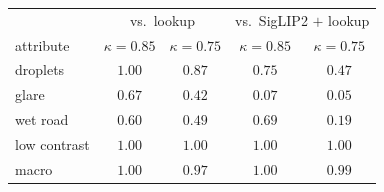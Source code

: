 \begin{tabular}{lcccc}
\toprule
 & \multicolumn{2}{c}{vs.\ lookup} & \multicolumn{2}{c}{vs.\ SigLIP2 $+$ lookup}\\
attribute & $\kappa=0.85$ & $\kappa=0.75$ & $\kappa=0.85$ & $\kappa=0.75$\\
\midrule
droplets & $1.00$ & $0.87$ & $0.75$ & $0.47$\\
glare & $0.67$ & $0.42$ & $0.07$ & $0.05$\\
wet road & $0.60$ & $0.49$ & $0.69$ & $0.19$\\
low contrast & $1.00$ & $1.00$ & $1.00$ & $1.00$\\
macro & $1.00$ & $0.97$ & $1.00$ & $0.99$\\
\bottomrule
\end{tabular}
